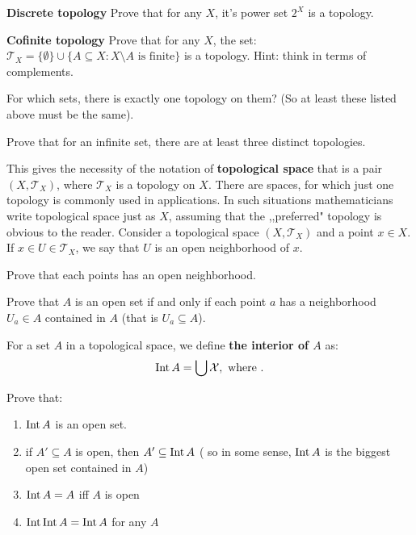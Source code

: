 \begin{prob}
	\textbf{Discrete topology} Prove that for any $X$, it's power set $2^X$ is a topology.
\end{prob}

\begin{prob}
	\textbf{Cofinite topology} Prove that for any $X$, the set:
  $\mathcal T_X=\{\emptyset\}\cup \{A\subseteq X : X\setminus A \text{ is finite}\}$ is a topology. Hint: think in terms of complements.
\end{prob}

\begin{prob}
	For which sets, there is exactly one topology on them? (So at least
  these listed above must be the same).
\end{prob}

\begin{prob}
	Prove that for an infinite set, there are at least three distinct
  topologies.
\end{prob}

\noindent This gives the necessity of the notation of \textbf{topological space} that is a pair $(X,\mathcal T_X)$, where $\mathcal T_X$ is a topology on
$X$. There are spaces, for which just one topology is commonly used in applications. In such situations mathematicians write topological space just as
$X$, assuming that the ,,preferred" topology is obvious to the reader.
Consider a topological space $(X,\mathcal T_X)$ and a point $x\in X$.
If $x\in U\in \mathcal T_X$, we say that $U$ is an open neighborhood
of $x$.

\begin{prob}
  Prove that each points has an open neighborhood.
\end{prob}

\begin{prob}
  Prove that $A$ is an open set if and only if each point $a$ has
  a neighborhood $U_a\in A$ contained in $A$
  (that is $U_a\subseteq A$).
\end{prob}

\noindent For a set $A$ in a topological space, we define \textbf{the
interior of $A$} as:
$$\text{Int\,} A=\bigcup \mathcal X, \text{ where }.$$

\begin{prob}
  Prove that:
  \begin{enumerate}
    \item $\text{Int\,} A$ is an open set.
    \item if $A'\subseteq A$ is open, then $A'\subseteq \text{Int\,} A$ (
    so in some sense, $\text{Int\,} A$ is the biggest open set contained in
    $A$)
    \item $\text{Int\,} A = A$ iff $A$ is open
    \item $\text{Int\,} \text{Int\,} A = \text{Int\,} A$ for any $A$
  \end{enumerate}
\end{prob}

